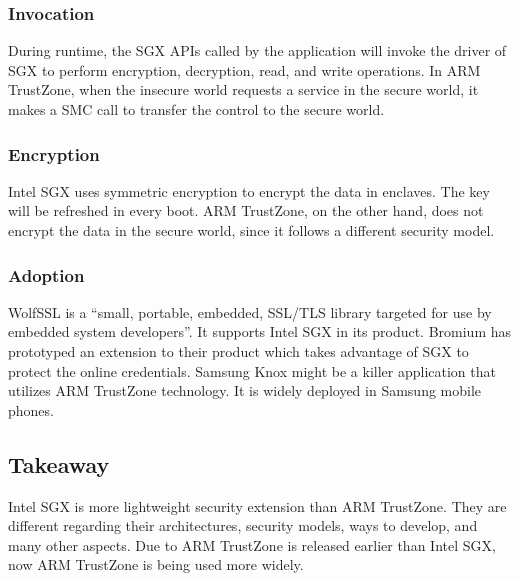 \subsubsection{Invocation}
During runtime, the SGX APIs called by the application will invoke
the driver of SGX to perform encryption, decryption, read, and write
operations. In ARM TrustZone, when the insecure world requests a service
in the secure world, it makes a SMC call to transfer the control to
the secure world.    



\subsubsection{Encryption}
Intel SGX uses symmetric encryption to encrypt the data in 
enclaves. The key will be refreshed in every boot. ARM TrustZone,
on the other hand, does not encrypt the data in the secure world,
since it follows a different security model.      



\subsubsection{Adoption}
WolfSSL is a ``small, portable, embedded, SSL/TLS library targeted
for use by embedded system developers''. It supports Intel SGX in
its product. Bromium has prototyped an extension to their product 
which takes advantage of SGX to protect the online credentials.
Samsung Knox might be a killer application that utilizes ARM TrustZone
technology. It is widely deployed in Samsung mobile phones. 


\subsection{Takeaway}
Intel SGX is more lightweight security extension than ARM TrustZone.
They are different regarding their architectures, security models,
ways to develop, and many other aspects. Due to ARM TrustZone is released
earlier than Intel SGX, now ARM TrustZone is being used more widely.   




